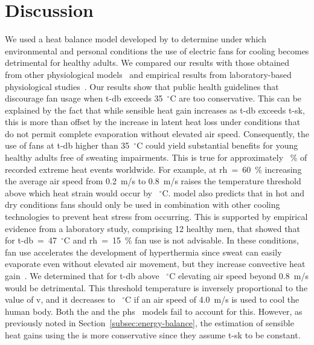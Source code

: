 
\section{Discussion}\label{sec:discussion}

We used a heat balance model developed by  to determine under which environmental and personal conditions the use of electric fans for cooling becomes detrimental for healthy adults.
We compared our results with those obtained from other physiological models~\cite{Jay2015, iso7933} and empirical results from laboratory-based physiological studies~\cite{Rate2015, Morris2019}.
Our results show that public health guidelines that discourage fan usage when \ac{t-db} exceeds 35~$^{\circ}$C are too conservative.
This can be explained by the fact that while sensible heat gain increases as \ac{t-db} exceeds \ac{t-sk}, this is more than offset by the increase in latent heat loss under conditions that do not permit complete evaporation without elevated air speed.
Consequently, the use of fans at \ac{t-db} higher than 35~$^{\circ}$C could yield substantial benefits for young healthy adults free of sweating impairments.
This is true for approximately ~\% of recorded extreme heat events worldwide.
For example, at \ac{rh}~=~60~\% increasing the average air speed from 0.2~m/s to 0.8~m/s raises the temperature threshold above which heat strain would occur by ~$^{\circ}$C.\@
{} model also predicts that in hot and dry conditions fans should only be used in combination with other cooling technologies to prevent heat stress from occurring.
This is supported by empirical evidence from a laboratory study, comprising 12 healthy men, that showed that for \ac{t-db}~=~47~$^{\circ}$C and \ac{rh}~=~15~\% fan use is not advisable.
In these conditions, fan use accelerates the development of hyperthermia since sweat can easily evaporate even without elevated air movement, but they increase convective heat gain~\cite{Morris2021a}.
We determined that for \ac{t-db} above ~$^{\circ}$C elevating air speed beyond 0.8~m/s would be detrimental.
This threshold temperature is inversely proportional to the value of \ac{v}, and it decreases to ~$^{\circ}$C if an air speed of 4.0~m/s is used to cool the human body.
Both the  and the \ac{phs}~\cite{iso7933} models fail to account for this.
However, as previously noted in Section~\ref{subsec:energy-balance}, the estimation of sensible heat gains using the  is more conservative since they assume \ac{t-sk} to be constant.
